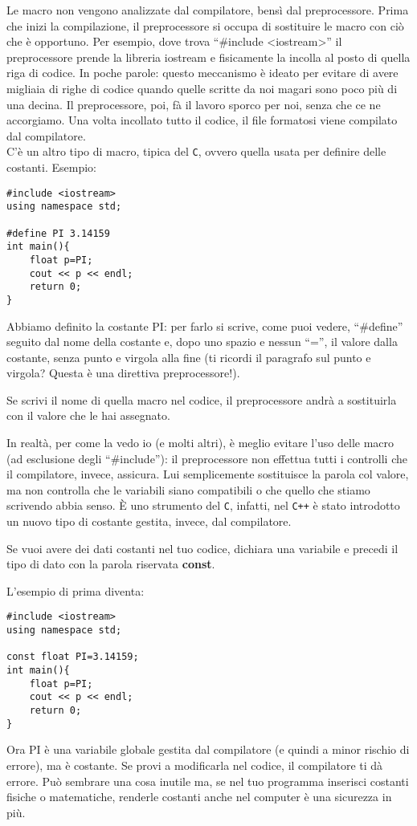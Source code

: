 	Le macro non vengono analizzate dal compilatore, bensì dal preprocessore. Prima che inizi la compilazione, il preprocessore si occupa di sostituire le macro con ciò che è opportuno. Per esempio, dove trova ``\#include <iostream>'' il preprocessore prende la libreria iostream e fisicamente la incolla al posto di quella riga di codice. In poche parole: questo meccanismo è ideato per evitare di avere migliaia di righe di codice quando quelle scritte da noi magari sono poco più di una decina. Il preprocessore, poi, fà il lavoro sporco per noi, senza che ce ne accorgiamo. Una volta incollato tutto il codice, il file formatosi viene compilato dal compilatore.\\
	
	C'è un altro tipo di macro, tipica del \verb|C|, ovvero quella usata per definire delle costanti. 
	Esempio:
	\begin{lstlisting}
#include <iostream>
using namespace std;

#define PI 3.14159
int main(){
	float p=PI;
	cout << p << endl;
	return 0;
}
	\end{lstlisting}
	Abbiamo definito la costante PI: per farlo si scrive, come puoi vedere, ``\#define'' seguito dal nome della costante e, dopo uno spazio e nessun ``='', il valore dalla costante,  senza punto e virgola alla fine (ti ricordi il paragrafo sul punto e virgola? Questa è una direttiva preprocessore!).
	
	Se scrivi il nome di quella macro nel codice, il preprocessore andrà a sostituirla con il valore che le hai assegnato. 
	
	In realtà, per come la vedo io (e molti altri), è meglio evitare l'uso delle macro (ad esclusione degli ``\#include''): il preprocessore non effettua tutti i controlli che il compilatore, invece, assicura. Lui semplicemente sostituisce la parola col valore, ma non controlla che le variabili siano compatibili o che quello che stiamo scrivendo abbia senso. \`E uno strumento del \verb|C|, infatti, nel \verb|C++| è stato introdotto un nuovo tipo di costante gestita, invece, dal compilatore. 
	
	Se vuoi avere dei dati costanti nel tuo codice, dichiara una variabile e precedi il tipo di dato con la parola riservata \textbf{const}.
	
	L'esempio di prima diventa:
	\begin{lstlisting}
#include <iostream>
using namespace std;
	
const float PI=3.14159;
int main(){
	float p=PI;
	cout << p << endl;
	return 0;
}
	\end{lstlisting}
	Ora PI è una variabile globale gestita dal compilatore (e quindi a minor rischio di errore), ma è costante. Se provi a modificarla nel codice, il compilatore ti dà errore. Può sembrare una cosa inutile ma, se nel tuo programma inserisci costanti fisiche o matematiche, renderle costanti anche nel computer è una sicurezza in più. 
	

